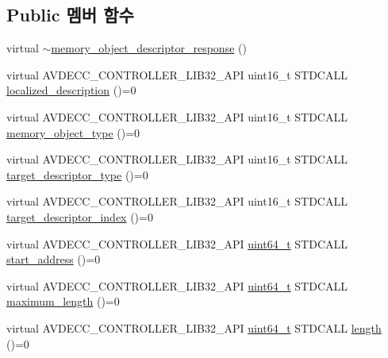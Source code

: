 \subsection*{Public 멤버 함수}
\begin{DoxyCompactItemize}
\item 
virtual \hyperlink{classavdecc__lib_1_1memory__object__descriptor__response_a6ab137e12f638f69ccd873afb04c5374}{$\sim$memory\+\_\+object\+\_\+descriptor\+\_\+response} ()
\item 
virtual A\+V\+D\+E\+C\+C\+\_\+\+C\+O\+N\+T\+R\+O\+L\+L\+E\+R\+\_\+\+L\+I\+B32\+\_\+\+A\+PI uint16\+\_\+t S\+T\+D\+C\+A\+LL \hyperlink{classavdecc__lib_1_1memory__object__descriptor__response_a1fb9de45567df344090a1407aa6b775f}{localized\+\_\+description} ()=0
\item 
virtual A\+V\+D\+E\+C\+C\+\_\+\+C\+O\+N\+T\+R\+O\+L\+L\+E\+R\+\_\+\+L\+I\+B32\+\_\+\+A\+PI uint16\+\_\+t S\+T\+D\+C\+A\+LL \hyperlink{classavdecc__lib_1_1memory__object__descriptor__response_a87d68513b9e53a9a93664712cd2ef0d3}{memory\+\_\+object\+\_\+type} ()=0
\item 
virtual A\+V\+D\+E\+C\+C\+\_\+\+C\+O\+N\+T\+R\+O\+L\+L\+E\+R\+\_\+\+L\+I\+B32\+\_\+\+A\+PI uint16\+\_\+t S\+T\+D\+C\+A\+LL \hyperlink{classavdecc__lib_1_1memory__object__descriptor__response_a032532c7dbbccc8502ceb8c8666df8f7}{target\+\_\+descriptor\+\_\+type} ()=0
\item 
virtual A\+V\+D\+E\+C\+C\+\_\+\+C\+O\+N\+T\+R\+O\+L\+L\+E\+R\+\_\+\+L\+I\+B32\+\_\+\+A\+PI uint16\+\_\+t S\+T\+D\+C\+A\+LL \hyperlink{classavdecc__lib_1_1memory__object__descriptor__response_af81691c2662f41ae30732f134950dc64}{target\+\_\+descriptor\+\_\+index} ()=0
\item 
virtual A\+V\+D\+E\+C\+C\+\_\+\+C\+O\+N\+T\+R\+O\+L\+L\+E\+R\+\_\+\+L\+I\+B32\+\_\+\+A\+PI \hyperlink{parse_8c_aec6fcb673ff035718c238c8c9d544c47}{uint64\+\_\+t} S\+T\+D\+C\+A\+LL \hyperlink{classavdecc__lib_1_1memory__object__descriptor__response_ab812aec6523353c936be2a4019df1c1c}{start\+\_\+address} ()=0
\item 
virtual A\+V\+D\+E\+C\+C\+\_\+\+C\+O\+N\+T\+R\+O\+L\+L\+E\+R\+\_\+\+L\+I\+B32\+\_\+\+A\+PI \hyperlink{parse_8c_aec6fcb673ff035718c238c8c9d544c47}{uint64\+\_\+t} S\+T\+D\+C\+A\+LL \hyperlink{classavdecc__lib_1_1memory__object__descriptor__response_a36919f2d5c9feee8b27cf73fde079963}{maximum\+\_\+length} ()=0
\item 
virtual A\+V\+D\+E\+C\+C\+\_\+\+C\+O\+N\+T\+R\+O\+L\+L\+E\+R\+\_\+\+L\+I\+B32\+\_\+\+A\+PI \hyperlink{parse_8c_aec6fcb673ff035718c238c8c9d544c47}{uint64\+\_\+t} S\+T\+D\+C\+A\+LL \hyperlink{classavdecc__lib_1_1memory__object__descriptor__response_a29753c4d47c3bab707360b33af66c1df}{length} ()=0

\end{DoxyCompactItemize}
